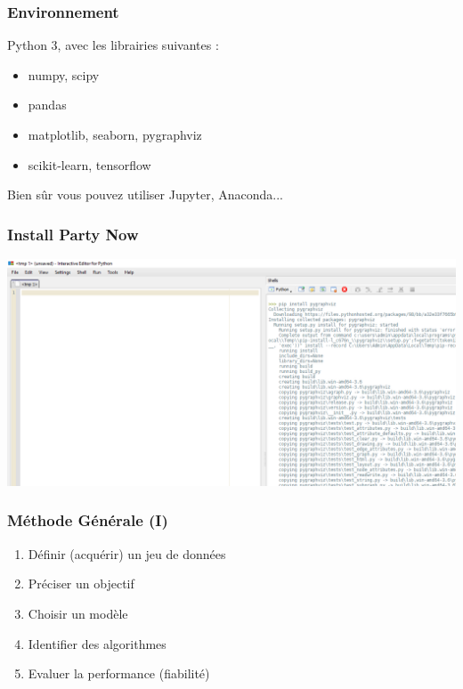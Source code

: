 \documentclass[11pt]{beamer}
\newenvironment{slide}[1]{%
\begin{frame}[environment=slide]
\frametitle{#1}
}{%
\end{frame}
}
\begin{document}
\begin{slide}{Environnement}
Python 3, avec les librairies suivantes :\\

\begin{itemize}
	\item numpy, scipy
	\item pandas
	\item matplotlib, seaborn, pygraphviz
	\item scikit-learn, tensorflow
\end{itemize}	

Bien sûr vous pouvez utiliser Jupyter, Anaconda...
	
\end{slide}

\begin{slide}{Install Party Now}

\includegraphics[scale=0.25]{pyzo}

\end{slide}

\begin{slide}{Méthode Générale (I)}

\begin{enumerate}

\item Définir (acquérir) un jeu de données
\pause
\item Préciser un objectif
\pause
\item Choisir un modèle
\pause
\item Identifier des algorithmes
\pause
\item Evaluer la performance (fiabilité)

\end{enumerate}

\end{slide}
\end{document}
